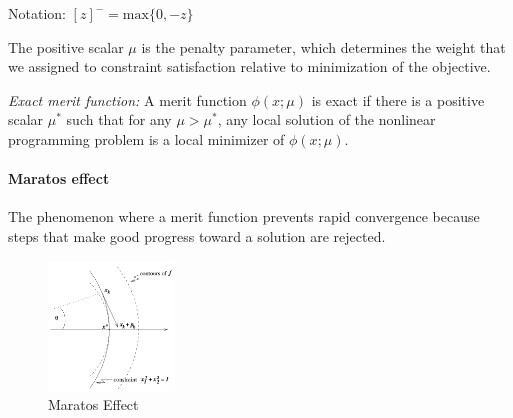 Notation: $[z]^- = \text{max}\{0, -z\}$

The positive scalar $\mu$ is the penalty parameter, which determines the weight that we assigned to constraint satisfaction relative to minimization of the objective.

\textit{Exact merit function:} A merit function $\phi(x; \mu)$ is exact if there is a positive scalar $\mu^*$ such that for any $\mu > \mu^*$, any local solution of the nonlinear programming problem is a local minimizer of $\phi(x; \mu)$.

\paragraph{Maratos effect} The phenomenon where a merit function prevents rapid convergence because steps that make good progress toward a solution are rejected.
%
\begin{figure}[H]
	\centering
	\includegraphics[width=0.3\textwidth]{images/maratos_effect}
	\caption{Maratos Effect}
	\label{fig:maratos_effect}
\end{figure}

